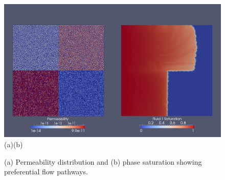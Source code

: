 
\begin{figure}[h!]
   \vbox{
     \hbox{\includegraphics[width=\columnwidth,clip]{./Pics/PermField_Saturation.png}}
     \hbox{\hspace{4cm}(a)\hspace{7.8cm}(b)}}
        \caption{(a) Permeability distribution and (b) phase saturation showing preferential flow pathways.}
        \label{fig:PermField_Saturation}  
\end{figure}
\clearpage

